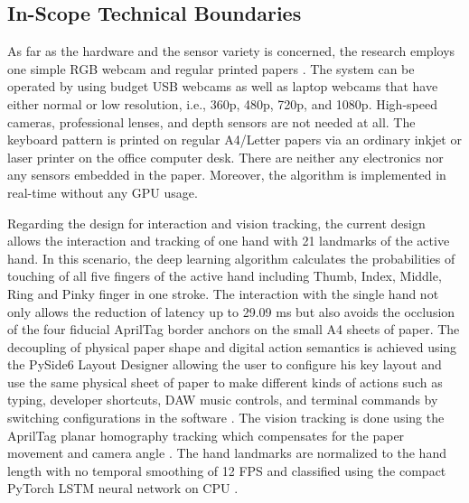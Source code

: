 \subsection{In-Scope Technical Boundaries}
\label{subsec:in_scope_boundaries}
As far as the hardware and the sensor variety is concerned, the research employs one simple RGB webcam and regular printed papers \cite{Posner2012Single, Enkhbat2020HandKey, Sreenath2021Monocular}. The system can be operated by using budget USB webcams as well as laptop webcams that have either normal or low resolution, i.e., 360p, 480p, 720p, and 1080p. High-speed cameras, professional lenses, and depth sensors are not needed at all. The keyboard pattern is printed on regular A4/Letter papers via an ordinary inkjet or laser printer on the office computer desk. There are neither any electronics nor any sensors embedded in the paper. Moreover, the algorithm is implemented in real-time without any GPU usage.

Regarding the design for interaction and vision tracking, the current design allows the interaction and tracking of one hand with 21 landmarks of the active hand. In this scenario, the deep learning algorithm calculates the probabilities of touching of all five fingers of the active hand including Thumb, Index, Middle, Ring and Pinky finger in one stroke. The interaction with the single hand not only allows the reduction of latency up to 29.09 ms but also avoids the occlusion of the four fiducial AprilTag border anchors on the small A4 sheets of paper. The decoupling of physical paper shape and digital action semantics is achieved using the PySide6 Layout Designer allowing the user to configure his key layout and use the same physical sheet of paper to make different kinds of actions such as typing, developer shortcuts, DAW music controls, and terminal commands by switching configurations in the software \cite{Doan2022Efficient, Li2021CNN, Lee2022Virtual}. The vision tracking is done using the AprilTag planar homography tracking which compensates for the paper movement and camera angle \cite{Wang2016AprilTag2, Kalaitzakis2021Fiducial}. The hand landmarks are normalized to the hand length with no temporal smoothing of 12 FPS and classified using the compact PyTorch LSTM neural network on CPU \cite{Hochreiter1997LSTM, Zhang2020MediaPipe, GilMartin2023Hand}.


